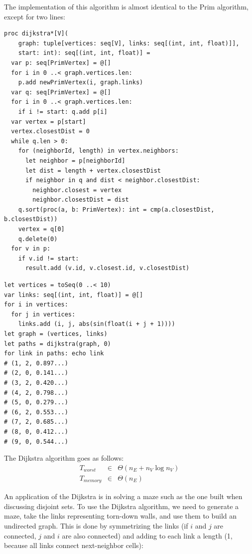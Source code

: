 \documentclass[justified, sixbynine]{tufte-book}
\def\ft{\small\tt}
\theoremstyle{plain}%
\newtheorem * {corollary}{Corollary}
\theoremstyle{definition}
\theoremstyle{remark}
\newtheorem * {remark}{Remark}
\newtheorem * {note}{Note}
\begin{document}
\begin{fullwidth}
The implementation of this algorithm is almost identical to the Prim algorithm, except for two lines:


\begin{lstlisting}[caption={in file: {\ft nlib/graph.nim}}]
proc dijkstra*[V](
    graph: tuple[vertices: seq[V], links: seq[(int, int, float)]],
    start: int): seq[(int, int, float)] =
  var p: seq[PrimVertex] = @[]
  for i in 0 ..< graph.vertices.len:
    p.add newPrimVertex(i, graph.links)
  var q: seq[PrimVertex] = @[]
  for i in 0 ..< graph.vertices.len:
    if i != start: q.add p[i]
  var vertex = p[start]
  vertex.closestDist = 0
  while q.len > 0:
    for (neighborId, length) in vertex.neighbors:
      let neighbor = p[neighborId]
      let dist = length + vertex.closestDist
      if neighbor in q and dist < neighbor.closestDist:
        neighbor.closest = vertex
        neighbor.closestDist = dist
    q.sort(proc(a, b: PrimVertex): int = cmp(a.closestDist, b.closestDist))
    vertex = q[0]
    q.delete(0)
  for v in p:
    if v.id != start:
      result.add (v.id, v.closest.id, v.closestDist)
\end{lstlisting}

\begin{lstlisting}
let vertices = toSeq(0 ..< 10)
var links: seq[(int, int, float)] = @[]
for i in vertices:
  for j in vertices:
    links.add (i, j, abs(sin(float(i + j + 1))))
let graph = (vertices, links)
let paths = dijkstra(graph, 0)
for link in paths: echo link
# (1, 2, 0.897...)
# (2, 0, 0.141...)
# (3, 2, 0.420...)
# (4, 2, 0.798...)
# (5, 0, 0.279...)
# (6, 2, 0.553...)
# (7, 2, 0.685...)
# (8, 0, 0.412...)
# (9, 0, 0.544...)
\end{lstlisting}

The Dijkstra algorithm goes as follows:
\begin{eqnarray}
T_{worst} &\in &\Theta (n_E+n_V\log n_V) \\
T_{memory} &\in &\Theta (n_E)
\end{eqnarray}

An application of the Dijkstra is in solving a maze such as the one built when discussing disjoint sets. To use the Dijkstra algorithm, we need to generate a maze, take the links representing torn-down walls, and use them to build an undirected graph. This is done by symmetrizing the links (if $i$ and $j$ are connected, $j$ and $i$ are also connected) and adding to each link a length (1, because all links connect next-neighbor cells):


\end{fullwidth}
\end{document}
